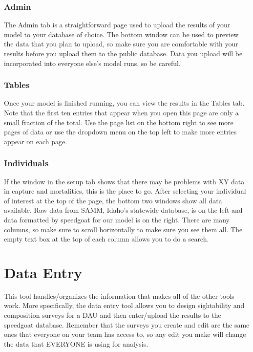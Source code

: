\documentclass[
]{book}
\begin{document}
\hypertarget{surv-admin}{%
\subsection{Admin}\label{surv-admin}}

The Admin tab is a straightforward page used to upload the results of your model to your database of choice. The bottom window can be used to preview the data that you plan to upload, so make sure you are comfortable with your results before you upload them to the public database. Data you upload will be incorporated into everyone else's model runs, so be careful.

\hypertarget{surv-tables}{%
\subsection{Tables}\label{surv-tables}}

Once your model is finished running, you can view the results in the Tables tab. Note that the first ten entries that appear when you open this page are only a small fraction of the total. Use the page list on the bottom right to see more pages of data or use the dropdown menu on the top left to make more entries appear on each page.

\hypertarget{surv-indiv}{%
\subsection{Individuals}\label{surv-indiv}}

If the window in the setup tab shows that there may be problems with XY data in capture and mortalities, this is the place to go. After selecting your individual of interest at the top of the page, the bottom two windows show all data available. Raw data from SAMM, Idaho's statewide database, is on the left and data formatted by speedgoat for our model is on the right. There are many columns, so make sure to scroll horizontally to make sure you see them all. The empty text box at the top of each column allows you to do a search.

\hypertarget{de}{%
\chapter{Data Entry}\label{de}}

This tool handles/organizes the information that makes all of the other tools work. More specifically, the data entry tool allows you to design sightability and composition surveys for a DAU and then enter/upload the results to the speedgoat database. Remember that the surveys you create and edit are the same ones that everyone on your team has access to, so any edit you make will change the data that EVERYONE is using for analysis.
\end{document}
